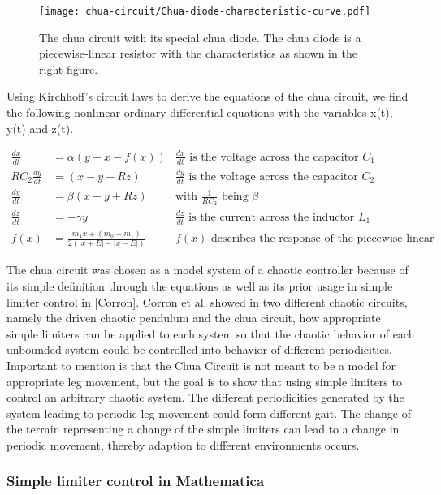\documentclass[main]{subfiles}
\begin{document}
\begin{figure}[H]
\centering

\texttt{[image: chua-circuit/Chua-diode-characteristic-curve.pdf]}
\caption[The chua circuit]{The chua circuit with its special chua diode. The chua diode is a piecewise-linear resistor with the characteristics as shown in the right figure.}
\label{figure:chuacircuit}
\end{figure}

Using Kirchhoff's circuit laws to derive the equations of the chua circuit, we find the following nonlinear ordinary differential equations with the variables x(t), y(t) and z(t).

\begin{align*}
\frac{dx}{dt}&=\alpha (y-x-f(x)) &\frac{dx}{dt}\text{ is the voltage across the capacitor }C_1\\
RC_2\frac{dy}{dt}&= (x-y+Rz) &\frac{dy}{dt}\text{ is the voltage across the capacitor }C_2\\
\frac{dy}{dt}&=\beta (x-y+Rz) &\text{with } \frac{1}{RC_2} \text{ being }\beta\\
\frac{dz}{dt}&=-\gamma y &\frac{dz}{dt}\text{ is the current across the inductor }L_1\\
f (x) &= \frac{m_1 x + (m_0 - m_1)}{2 (| x + E | -| x - E |)} &f(x)\text{ describes the response of the piecewise linear resistor}
\end{align*}

The chua circuit was chosen as a model system of a chaotic controller because of its simple definition through the equations as well as its prior usage in simple limiter control in [Corron]. Corron et al. showed in two different chaotic circuits, namely the driven chaotic pendulum and the chua circuit, how appropriate simple limiters can be applied to each system so that the chaotic behavior of each unbounded system could be controlled into behavior of different periodicities. Important to mention is that the Chua Circuit is not meant to be a model for appropriate leg movement, but the goal is to show that using simple limiters to control an arbitrary chaotic system. The different periodicities generated by the system leading to periodic leg movement could form different gait. The change of the terrain representing a change of the simple limiters can lead to a change in periodic movement, thereby adaption to different environments occurs. 

\subsubsection{Simple limiter control in Mathematica}
\label{subsubsec:simple-limiter-mathematica}
\end{document}
